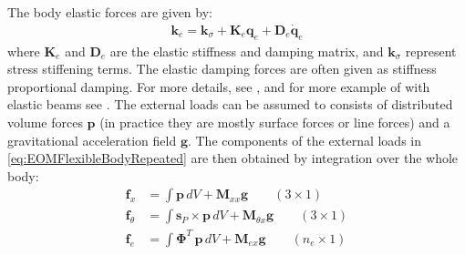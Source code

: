 \documentclass[wes, manuscript]{copernicus}
\renewcommand{\v}[1]{\boldsymbol{#1}}
\newcommand{\m}[1]{\boldsymbol{#1}}
\begin{document}
% 
The body elastic forces are given by:
\begin{align}
  \v{k}_e =  \v{k}_\sigma + \m{K}_e \v{q}_e  + \m{D}_e \v{\dot{q}}_e     %
\end{align}
where $\m{K}_e$ and $\m{D}_e$ are the elastic stiffness and damping matrix, and $\v{k}_\sigma$ represent stress stiffening terms. 
The elastic damping forces are often given as stiffness proportional damping.
For more details, see \cite{Wallrapp:1994}, and for more example of with elastic beams see \cite{branlard:2019flex}.
% 
The external loads can be assumed to consists of distributed volume forces $\v{p}$ (in practice they are mostly surface forces or line forces) and a gravitational acceleration field $\v{g}$.
The components of the external loads  in  \autoref{eq:EOMFlexibleBodyRepeated} are then obtained by integration over the whole body:
\begin{align}
    \v{f}_x&=\int \v{p} \, dV
        + \m{M}_{xx}\v{g}
        \qquad (3\times 1)
            \label{eq:genQgeneral}
    \\
    \v{f}_\theta&=\int \v{s}_P\times\v{p} \, dV
        + \m{M}_{\theta x}\v{g}
        \qquad (3\times 1)
    \\
    \v{f}_e&=\int {\m{\Phi}}^T\, \v{p} \, dV
        + \m{M}_{e x}\v{g}
        \qquad (n_e\times 1)
\end{align}




% 
% 
\end{document}
